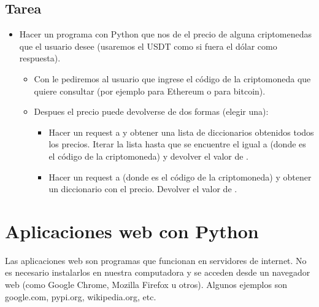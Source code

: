 \documentclass[a5paper,9pt,spanish]{sphinxmanual}
\begin{document}
\section{Tarea}
\label{\detokenize{requests:tarea}}\begin{itemize}
\item {} 
\sphinxAtStartPar
Hacer un programa con Python que nos de el precio de alguna
criptomenedas que el usuario desee (usaremos el USDT como si
fuera el dólar como respuesta).
\begin{itemize}
\item {} 
\sphinxAtStartPar
Con  le pediremos al usuario que ingrese el código de la
criptomoneda que quiere consultar (por ejemplo  para Ethereum
o  para bitcoin).

\item {} 
\sphinxAtStartPar
Despues el precio puede devolverse de dos formas (elegir una):
\begin{itemize}
\item {} 
\sphinxAtStartPar
Hacer un request a 
y obtener una lista de diccionarios obtenidos todos los precios.
Iterar la lista hasta que se encuentre el  igual a
 (donde  es el código de la criptomoneda) y
devolver el valor de .

\item {} 
\sphinxAtStartPar
Hacer un request a 
(donde  es el código de la criptomoneda) y obtener un
diccionario con el precio. Devolver el valor de .

\end{itemize}

\end{itemize}

\end{itemize}

\sphinxstepscope


\chapter{Aplicaciones web con Python}
\label{\detokenize{flask:aplicaciones-web-con-python}}\label{\detokenize{flask::doc}}
\sphinxAtStartPar
Las aplicaciones web son programas que funcionan en servidores de internet.
No es necesario instalarlos en nuestra computadora y se acceden
desde un navegador web (como Google Chrome, Mozilla Firefox u otros).
Algunos ejemplos son google.com, pypi.org, wikipedia.org, etc.
\end{document}
